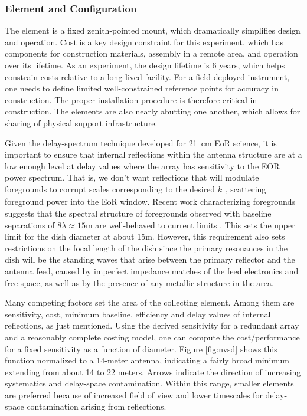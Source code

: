\documentclass[preprint]{aastex}
\def\kpar{k_{\|}}
\def\kpar{k_{\|}}
\begin{document}
\vspace{-0.25in}
\subsubsection{Element and Configuration}
\vspace{-6pt}


The element is a fixed zenith-pointed mount, which dramatically simplifies design and
operation. Cost is a key design constraint for this experiment, which has components
for construction materials, assembly in a remote area, and operation over its
lifetime. As an experiment, the design lifetime is 6 years, which helps constrain
costs relative to a long-lived facility. For a field-deployed instrument, one needs
to define limited well-constrained reference points for accuracy in construction. The
proper installation procedure is therefore critical in construction. The elements are
also nearly abutting one another, which allows for sharing of physical support
infrastructure.

Given the delay-spectrum technique developed for 21~cm EoR science, it is important
to ensure that internal reflections within the antenna structure are at a low enough
level at delay values where the array has sensitivity to the EOR power spectrum. That
is, we don't want reflections that will modulate foregrounds to corrupt scales
corresponding to the desired $\kpar$, scattering foreground power into the EoR
window. Recent work characterizing foregrounds suggests that the spectral structure
of foregrounds observed with baseline separations of $8\lambda \approx 15$m are
well-behaved to current limits \citep{pober_et_al2013b,parsons_et_al2013}. This sets the upper limit
for the dish diameter at about 15m. However, this requirement also sets restrictions
on the focal length of the dish since the primary resonances in the dish will be the
standing waves that arise between the primary reflector and the antenna feed, caused
by imperfect impedance matches of the feed electronics and free space, as well as by
the presence of any metallic structure in the area.

Many competing factors set the area of the collecting element. Among them are
sensitivity, cost, minimum baseline, efficiency and delay values of internal
reflections, as just mentioned. Using the derived sensitivity for a redundant array
\citep{parsons_et_al2012a} and a reasonably complete costing model, one can compute
the cost/performance for a fixed sensitivity as a function of diameter. Figure
\ref{fig:nvsd} shows this function normalized to a 14-meter antenna, indicating a
fairly broad minimum extending from about 14 to 22 meters. Arrows indicate the
direction of increasing systematics and delay-space contamination. Within this range,
smaller elements are preferred because of increased field of view and lower
timescales for delay-space contamination arising from reflections.
\end{document}
